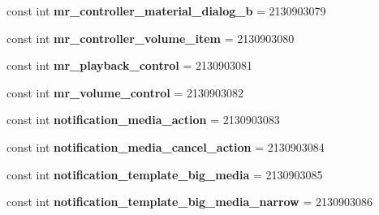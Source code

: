 \begin{DoxyCompactItemize}
\item 
\mbox{\label{class_pinned_app_1_1_droid_1_1_resource_1_1_layout_ac621c6e364071c68dab536ccef04d968}} 
const int {\bfseries mr\+\_\+controller\+\_\+material\+\_\+dialog\+\_\+b} = 2130903079
\item 
\mbox{\label{class_pinned_app_1_1_droid_1_1_resource_1_1_layout_ad7281da3ae37f94b5d2589ece1d9ad30}} 
const int {\bfseries mr\+\_\+controller\+\_\+volume\+\_\+item} = 2130903080
\item 
\mbox{\label{class_pinned_app_1_1_droid_1_1_resource_1_1_layout_a71caa961d657e2892a352a5fc3ae0f26}} 
const int {\bfseries mr\+\_\+playback\+\_\+control} = 2130903081
\item 
\mbox{\label{class_pinned_app_1_1_droid_1_1_resource_1_1_layout_adbbcc1cc2407308afb33352bb78896c6}} 
const int {\bfseries mr\+\_\+volume\+\_\+control} = 2130903082
\item 
\mbox{\label{class_pinned_app_1_1_droid_1_1_resource_1_1_layout_ab39c5f8fe1c95f56388033e5b304a6b6}} 
const int {\bfseries notification\+\_\+media\+\_\+action} = 2130903083
\item 
\mbox{\label{class_pinned_app_1_1_droid_1_1_resource_1_1_layout_a78c4eddb31b99a9d18d149421115c030}} 
const int {\bfseries notification\+\_\+media\+\_\+cancel\+\_\+action} = 2130903084
\item 
\mbox{\label{class_pinned_app_1_1_droid_1_1_resource_1_1_layout_ac939c6699d8d4ac5770439015e5b06dd}} 
const int {\bfseries notification\+\_\+template\+\_\+big\+\_\+media} = 2130903085
\item 
\mbox{\label{class_pinned_app_1_1_droid_1_1_resource_1_1_layout_a17bd665f5a95528ffe7f64f4afc73c69}} 
const int {\bfseries notification\+\_\+template\+\_\+big\+\_\+media\+\_\+narrow} = 2130903086
\item 

\end{DoxyCompactItemize}

